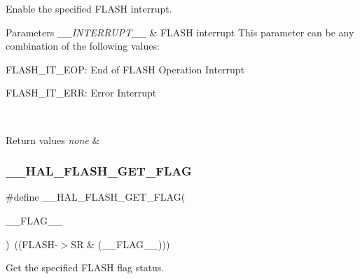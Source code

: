 Enable the specified F\+L\+A\+SH interrupt. 


\begin{DoxyParams}{Parameters}
{\em \+\_\+\+\_\+\+I\+N\+T\+E\+R\+R\+U\+P\+T\+\_\+\+\_\+} & F\+L\+A\+SH interrupt This parameter can be any combination of the following values\+: \begin{DoxyItemize}
\item F\+L\+A\+S\+H\+\_\+\+I\+T\+\_\+\+E\+OP\+: End of F\+L\+A\+SH Operation Interrupt \item F\+L\+A\+S\+H\+\_\+\+I\+T\+\_\+\+E\+RR\+: Error Interrupt ~\newline
\end{DoxyItemize}
\\
\hline
\end{DoxyParams}

\begin{DoxyRetVals}{Return values}
{\em none} & \\
\hline
\end{DoxyRetVals}
\mbox{\label{group___f_l_a_s_h___exported___macros_ga0d3dd161fecc0e47c9e109c7c28672c1}} 
\subsubsection{\texorpdfstring{\+\_\+\+\_\+\+H\+A\+L\+\_\+\+F\+L\+A\+S\+H\+\_\+\+G\+E\+T\+\_\+\+F\+L\+AG}{\_\_HAL\_FLASH\_GET\_FLAG}}
{\footnotesize\ttfamily \#define \+\_\+\+\_\+\+H\+A\+L\+\_\+\+F\+L\+A\+S\+H\+\_\+\+G\+E\+T\+\_\+\+F\+L\+AG(\begin{DoxyParamCaption}\item[{}]{\+\_\+\+\_\+\+F\+L\+A\+G\+\_\+\+\_\+ }\end{DoxyParamCaption})~((F\+L\+A\+SH-\/$>$SR \& (\+\_\+\+\_\+\+F\+L\+A\+G\+\_\+\+\_\+)))}



Get the specified F\+L\+A\+SH flag status. 


